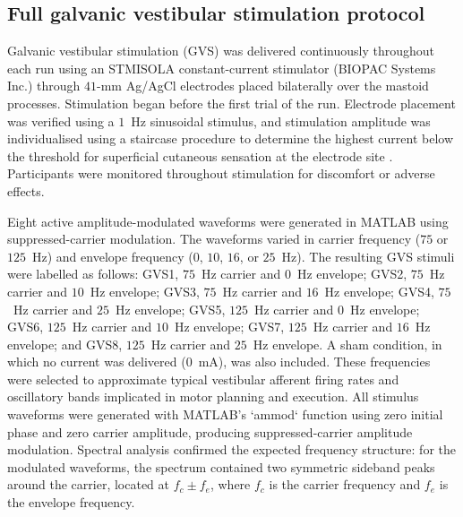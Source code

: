 \documentclass[utf8]{frontiers_suppmat}
\begin{document}
\subsection{Full galvanic vestibular stimulation protocol}
Galvanic vestibular stimulation (GVS) was delivered continuously throughout each run using an STMISOLA constant-current stimulator (BIOPAC Systems Inc.) through $41$-mm Ag/AgCl electrodes placed bilaterally over the mastoid processes. Stimulation began before the first trial of the run. Electrode placement was verified using a $1$~Hz sinusoidal stimulus, and stimulation amplitude was individualised using a staircase procedure to determine the highest current below the threshold for superficial cutaneous sensation at the electrode site \citep{nguyen2022thresholds}. Participants were monitored throughout stimulation for discomfort or adverse effects.

Eight active amplitude-modulated waveforms were generated in MATLAB using suppressed-carrier modulation. The waveforms varied in carrier frequency ($75$ or $125$~Hz) and envelope frequency ($0$, $10$, $16$, or $25$~Hz). The resulting GVS stimuli were labelled as follows: GVS1, $75$~Hz carrier and $0$~Hz envelope; GVS2, $75$~Hz carrier and $10$~Hz envelope; GVS3, $75$~Hz carrier and $16$~Hz envelope; GVS4, $75$~Hz carrier and $25$~Hz envelope; GVS5, $125$~Hz carrier and $0$~Hz envelope; GVS6, $125$~Hz carrier and $10$~Hz envelope; GVS7, $125$~Hz carrier and $16$~Hz envelope; and GVS8, $125$~Hz carrier and $25$~Hz envelope. A sham condition, in which no current was delivered ($0$~mA), was also included. These frequencies were selected to approximate typical vestibular afferent firing rates and oscillatory bands implicated in motor planning and execution. All stimulus waveforms were generated with MATLAB’s `ammod` function using zero initial phase and zero carrier amplitude, producing suppressed-carrier amplitude modulation. Spectral analysis confirmed the expected frequency structure: for the modulated waveforms, the spectrum contained two symmetric sideband peaks around the carrier, located at \( f_c \pm f_e \), where \( f_c \) is the carrier frequency and \( f_e \) is the envelope frequency.
\end{document}
